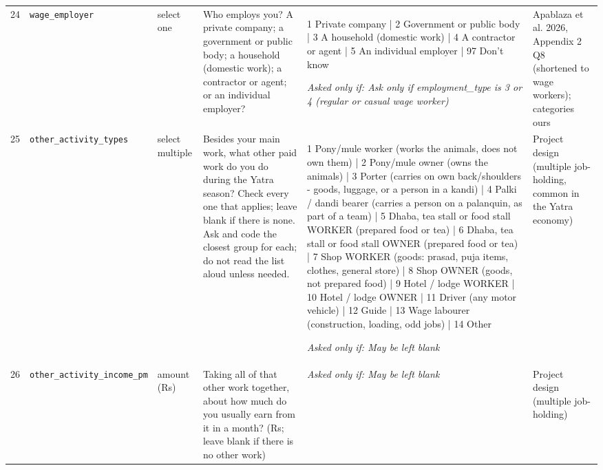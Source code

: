 \documentclass[9pt,a4paper,landscape]{article}
\begin{document}
\begin{longtable}{@{}p{0.5cm}p{3.3cm}p{1.7cm}p{7.3cm}p{5.6cm}p{5.4cm}@{}}
\footnotesize 24 & \footnotesize\texttt{wage\_employer} & \scriptsize select one & \footnotesize Who employs you? A private company; a government or public body; a household (domestic work); a contractor or agent; or an individual employer?\par\vspace{1pt}{\footnotesize\color{hdr}{\hifont आपको काम पर कौन रखता है? कोई निजी कंपनी; सरकारी या सार्वजनिक विभाग; कोई घर (घरेलू काम); ठेकेदार या एजेंट; या कोई व्यक्ति जो सीधे पैसे देता है?}} & \scriptsize 1 Private company | 2 Government or public body | 3 A household (domestic work) | 4 A contractor or agent | 5 An individual employer | 97 Don't know\par\vspace{1pt}\textit{Asked only if: Ask only if employment\_type is 3 or 4 (regular or casual wage worker)} & \scriptsize Apablaza et al. 2026, Appendix 2 Q8 (shortened to wage workers); categories ours\\
\footnotesize 25 & \footnotesize\texttt{other\_activity\_types} & \scriptsize select multiple & \footnotesize Besides your main work, what other paid work do you do during the Yatra season? Check every one that applies; leave blank if there is none. Ask and code the closest group for each; do not read the list aloud unless needed.\par\vspace{1pt}{\footnotesize\color{hdr}{\hifont वे कौन-कौन से काम हैं? जो-जो लागू हो, सब बताइए।}} & \scriptsize 1 Pony/mule worker (works the animals, does not own them) | 2 Pony/mule owner (owns the animals) | 3 Porter (carries on own back/shoulders - goods, luggage, or a person in a kandi) | 4 Palki / dandi bearer (carries a person on a palanquin, as part of a team) | 5 Dhaba, tea stall or food stall WORKER (prepared food or tea) | 6 Dhaba, tea stall or food stall OWNER (prepared food or tea) | 7 Shop WORKER (goods: prasad, puja items, clothes, general store) | 8 Shop OWNER (goods, not prepared food) | 9 Hotel / lodge WORKER | 10 Hotel / lodge OWNER | 11 Driver (any motor vehicle) | 12 Guide | 13 Wage labourer (construction, loading, odd jobs) | 14 Other\par\vspace{1pt}\textit{Asked only if: May be left blank} & \scriptsize Project design (multiple job-holding, common in the Yatra economy)\\
\footnotesize 26 & \footnotesize\texttt{other\_activity\_income\_pm} & \scriptsize amount (Rs) & \footnotesize Taking all of that other work together, about how much do you usually earn from it in a month? (Rs; leave blank if there is no other work)\par\vspace{1pt}{\footnotesize\color{hdr}{\hifont वह सारा दूसरा काम मिलाकर, महीने में लगभग कितना कमा लेते हैं? (रुपये)}} & \scriptsize \textit{Asked only if: May be left blank} & \scriptsize Project design (multiple job-holding)\\

\end{longtable}
\end{document}
